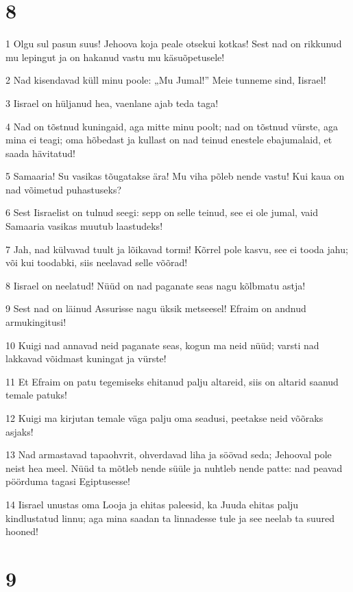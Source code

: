\chapter{8}

\par 1 Olgu sul pasun suus! Jehoova koja peale otsekui kotkas! Sest nad on rikkunud mu lepingut ja on hakanud vastu mu käsuõpetusele!
\par 2 Nad kisendavad küll minu poole: „Mu Jumal!” Meie tunneme sind, Iisrael!
\par 3 Iisrael on hüljanud hea, vaenlane ajab teda taga!
\par 4 Nad on tõstnud kuningaid, aga mitte minu poolt; nad on tõstnud vürste, aga mina ei teagi; oma hõbedast ja kullast on nad teinud enestele ebajumalaid, et saada hävitatud!
\par 5 Samaaria! Su vasikas tõugatakse ära! Mu viha põleb nende vastu! Kui kaua on nad võimetud puhastuseks?
\par 6 Sest Iisraelist on tulnud seegi: sepp on selle teinud, see ei ole jumal, vaid Samaaria vasikas muutub laastudeks!
\par 7 Jah, nad külvavad tuult ja lõikavad tormi! Kõrrel pole kasvu, see ei tooda jahu; või kui toodabki, siis neelavad selle võõrad!
\par 8 Iisrael on neelatud! Nüüd on nad paganate seas nagu kõlbmatu astja!
\par 9 Sest nad on läinud Assurisse nagu üksik metseesel! Efraim on andnud armukingitusi!
\par 10 Kuigi nad annavad neid paganate seas, kogun ma neid nüüd; varsti nad lakkavad võidmast kuningat ja vürste!
\par 11 Et Efraim on patu tegemiseks ehitanud palju altareid, siis on altarid saanud temale patuks!
\par 12 Kuigi ma kirjutan temale väga palju oma seadusi, peetakse neid võõraks asjaks!
\par 13 Nad armastavad tapaohvrit, ohverdavad liha ja söövad seda; Jehooval pole neist hea meel. Nüüd ta mõtleb nende süüle ja nuhtleb nende patte: nad peavad pöörduma tagasi Egiptusesse!
\par 14 Iisrael unustas oma Looja ja ehitas paleesid, ka Juuda ehitas palju kindlustatud linnu; aga mina saadan ta linnadesse tule ja see neelab ta suured hooned!

\chapter{9}

